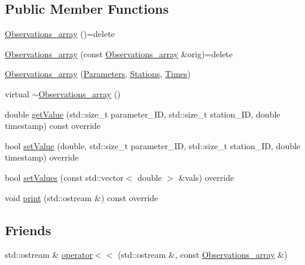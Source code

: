 \subsection*{Public Member Functions}
\begin{DoxyCompactItemize}
\item 
\mbox{\hyperlink{class_observations__array_a731dad95d0454c5848583a91e064a9cd}{Observations\+\_\+array}} ()=delete
\item 
\mbox{\hyperlink{class_observations__array_aa448781dd6c9c75fd3fa8ebf0e41e86d}{Observations\+\_\+array}} (const \mbox{\hyperlink{class_observations__array}{Observations\+\_\+array}} \&orig)=delete
\item 
\mbox{\hyperlink{class_observations__array_a33b9edf2cac9cfc23ba555c9362a2fc7}{Observations\+\_\+array}} (\mbox{\hyperlink{class_parameters}{Parameters}}, \mbox{\hyperlink{class_stations}{Stations}}, \mbox{\hyperlink{class_times}{Times}})
\item 
virtual \mbox{\hyperlink{class_observations__array_a3124448be571f561a2bd2e8b44c95a2e}{$\sim$\+Observations\+\_\+array}} ()
\item 
double \mbox{\hyperlink{class_observations__array_a33f2154b3fed9d488e06e8c92eecc4db}{get\+Value}} (std\+::size\+\_\+t parameter\+\_\+\+ID, std\+::size\+\_\+t station\+\_\+\+ID, double timestamp) const override
\item 
bool \mbox{\hyperlink{class_observations__array_a1708fe12a750cb68bb60782ab184605b}{set\+Value}} (double, std\+::size\+\_\+t parameter\+\_\+\+ID, std\+::size\+\_\+t station\+\_\+\+ID, double timestamp) override
\item 
bool \mbox{\hyperlink{class_observations__array_a59ee8d2a6b0d0158a3efa7c200c8ff43}{set\+Values}} (const std\+::vector$<$ double $>$ \&vals) override
\item 
void \mbox{\hyperlink{class_observations__array_a2563545e5a38ec7e3ec09380c0b38855}{print}} (std\+::ostream \&) const override
\end{DoxyCompactItemize}
\subsection*{Friends}
\begin{DoxyCompactItemize}
\item 
std\+::ostream \& \mbox{\hyperlink{class_observations__array_affb01c6a2af2ae2b833f7edec435234d}{operator$<$$<$}} (std\+::ostream \&, const \mbox{\hyperlink{class_observations__array}{Observations\+\_\+array}} \&)
\end{DoxyCompactItemize}
